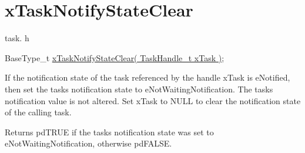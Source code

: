 \hypertarget{group__x_task_notify_state_clear}{}\section{x\+Task\+Notify\+State\+Clear}
\label{group__x_task_notify_state_clear}
task. h 
\begin{DoxyPre}BaseType\_t \hyperlink{task_8h_a4cb6c908a9d2d733e9d519d7dc27bb34}{xTaskNotifyStateClear( TaskHandle\_t xTask )};\end{DoxyPre}


If the notification state of the task referenced by the handle x\+Task is e\+Notified, then set the task\textquotesingle{}s notification state to e\+Not\+Waiting\+Notification. The task\textquotesingle{}s notification value is not altered. Set x\+Task to N\+U\+LL to clear the notification state of the calling task.

\begin{DoxyReturn}{Returns}
pd\+T\+R\+UE if the task\textquotesingle{}s notification state was set to e\+Not\+Waiting\+Notification, otherwise pd\+F\+A\+L\+SE. 
\end{DoxyReturn}
